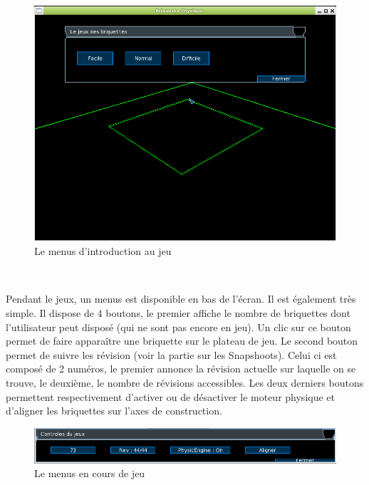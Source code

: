 \documentclass[frenchb,twoside]{EPURapport}
\begin{document}
\newpage

		\begin{figure}[h]
			\centering
			\includegraphics[width=16cm]{images/Menus_initial.png}
			\caption{\label{fig:menus_initial}Le menus d'introduction au jeu}
		\end{figure}
		
		\
		   
        Pendant le jeux, un menus est disponible en bas de l'écran. Il est
        également très simple. Il dispose de 4 boutons, le premier affiche le
        nombre de briquettes dont l'utilisateur peut disposé (qui ne sont pas
        encore en jeu). Un clic sur ce bouton permet de faire apparaître une
        briquette sur le plateau de jeu. Le second bouton permet de suivre les
        révision (voir la partie sur les Snapshoots). Celui ci est composé de 2
        numéros, le premier annonce la révision actuelle sur laquelle on se
        trouve, le deuxième, le nombre de révisions accessibles. Les deux
        derniers boutons permettent respectivement d'activer ou de désactiver le
        moteur physique et d'aligner les briquettes sur l'axes de construction.
		
		\begin{figure}[h]
			\centering
			\includegraphics[width=16cm]{images/menu_jeu.png}
			\caption{\label{fig:menu_jeu}Le menus en cours de jeu}
		\end{figure}
		
\end{document}

